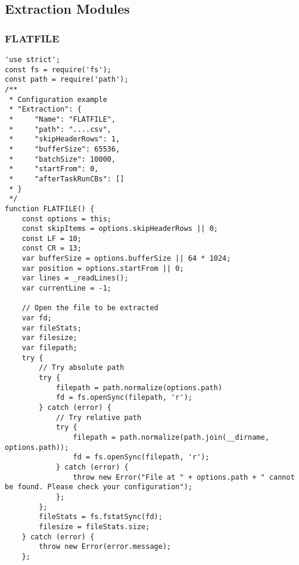 \subsection{Extraction Modules}
\subsubsection{FLATFILE}
\label{netl-extract-flatfile}
\begin{verbatim}
'use strict';
const fs = require('fs');
const path = require('path');
/**
 * Configuration example
 * "Extraction": {
 *     "Name": "FLATFILE",
 *     "path": "....csv",
 *     "skipHeaderRows": 1,
 *     "bufferSize": 65536,
 *     "batchSize": 10000,
 *     "startFrom": 0,
 *     "afterTaskRunCBs": []
 * }
 */
function FLATFILE() {
    const options = this;
    const skipItems = options.skipHeaderRows || 0;
    const LF = 10;
    const CR = 13;
    var bufferSize = options.bufferSize || 64 * 1024;
    var position = options.startFrom || 0;
    var lines = _readLines();
    var currentLine = -1;

    // Open the file to be extracted
    var fd;
    var fileStats;
    var filesize;
    var filepath;
    try {
        // Try absolute path
        try {
            filepath = path.normalize(options.path)
            fd = fs.openSync(filepath, 'r');
        } catch (error) {
            // Try relative path
            try {
                filepath = path.normalize(path.join(__dirname, options.path));
                fd = fs.openSync(filepath, 'r');
            } catch (error) {
                throw new Error("File at " + options.path + " cannot be found. Please check your configuration");
            };
        };
        fileStats = fs.fstatSync(fd);
        filesize = fileStats.size;
    } catch (error) {
        throw new Error(error.message);
    };


\end{verbatim}
